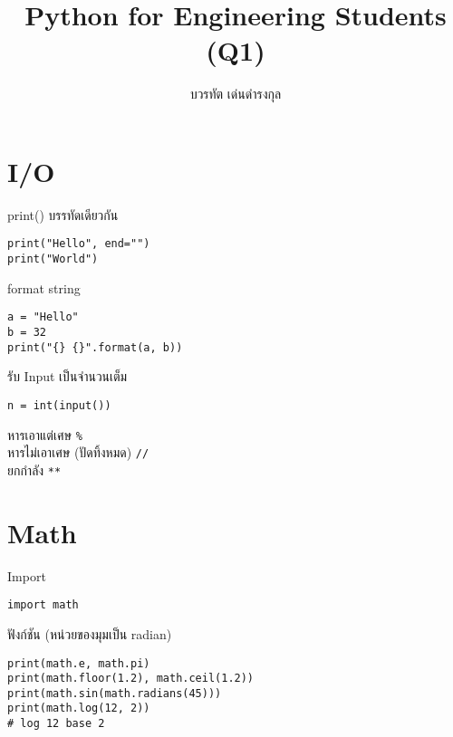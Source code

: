 \documentclass[11pt,a4paper,twocolumn]{article}
\title{Python for Engineering Students (Q1)}
\author{บวรทัต เด่นดำรงกุล \vspace{-5ex}}
\date{}
\begin{document}
\thispagestyle{titlepage}

\section*{I/O}
\vspace{-1ex}

print() บรรทัดเดียวกัน
\vspace{-2.5ex}
\begin{verbatim}
print("Hello", end="")
print("World")
\end{verbatim}
\vspace{-1ex}

format string
\vspace{-2.5ex}
\begin{verbatim}
a = "Hello"
b = 32
print("{} {}".format(a, b))
\end{verbatim}
\vspace{-1ex}

รับ Input เป็นจำนวนเต็ม
\vspace{-2.5ex}
\begin{verbatim}
n = int(input())
\end{verbatim}
\vspace{-1ex}

หารเอาแต่เศษ \verb|%|\\
หารไม่เอาเศษ (ปัดทิ้งหมด) \verb|//|\\
ยกกำลัง \verb|**|
\vspace{-1ex}

\vspace{-2ex}
\section*{Math}
\vspace{-1ex}

Import
\vspace{-2.5ex}
\begin{verbatim}
import math
\end{verbatim}
\vspace{-1ex}

ฟังก์ชัน (หน่วยของมุมเป็น radian)
\vspace{-2.5ex}
\begin{verbatim}
print(math.e, math.pi)
print(math.floor(1.2), math.ceil(1.2))
print(math.sin(math.radians(45)))
print(math.log(12, 2))
# log 12 base 2
\end{verbatim}
\vspace{-1ex}
\end{document}
